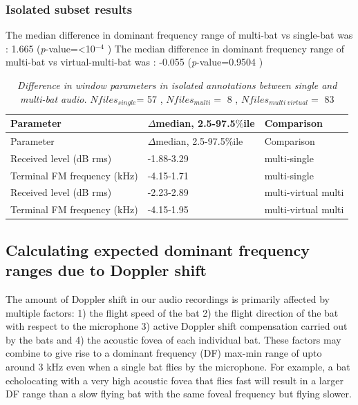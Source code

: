 \documentclass[
]{book}
\begin{document}
\hypertarget{isolated-subset-results}{%
\subsubsection{Isolated subset results}\label{isolated-subset-results}}

The median difference in dominant frequency range of multi-bat vs single-bat was : 1.665 (\emph{p}-value=\textless10\(^{-4}\) )
The median difference in dominant frequency range of multi-bat vs virtual-multi-bat was : -0.055 (\emph{p}-value=0.9504 )

\begin{longtable}[]{@{}lll@{}}
\caption{\label{tab:isolated} \label{tab:isolated} \emph{Difference in window parameters in isolated annotations between single and multi-bat audio.} \(Nfiles_{single}\)= 57 , \(Nfiles_{multi}=\) 8 , \(Nfiles_{multi \:virtual}=\) 83}\tabularnewline
\toprule
Parameter & \(\Delta\)median, 2.5-97.5\(\%\)ile & Comparison\tabularnewline
\midrule
\endfirsthead
\toprule
Parameter & \(\Delta\)median, 2.5-97.5\(\%\)ile & Comparison\tabularnewline
\midrule
\endhead
Received level (dB rms) & -1.88-3.29 & multi-single\tabularnewline
Terminal FM frequency (kHz) & -4.15-1.71 & multi-single\tabularnewline
Received level (dB rms) & -2.23-2.89 & multi-virtual multi\tabularnewline
Terminal FM frequency (kHz) & -4.15-1.95 & multi-virtual multi\tabularnewline
\bottomrule
\end{longtable}

\hypertarget{simdomfreqranges}{%
\subsection{Calculating expected dominant frequency ranges due to Doppler shift}\label{simdomfreqranges}}

The amount of Doppler shift in our audio recordings is primarily affected by multiple factors: 1) the flight speed of the bat 2) the flight direction of the bat with respect to the microphone 3) active Doppler shift compensation carried out by the bats and 4) the acoustic fovea of each individual bat. These factors may combine to give rise to a dominant frequency (DF) max-min range of upto around 3 kHz even when a single bat flies by the microphone. For example, a bat echolocating with a very high acoustic fovea that flies fast will result in a larger DF range than a slow flying bat with the same foveal frequency but flying slower.
\end{document}
